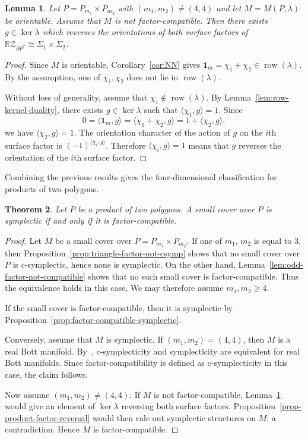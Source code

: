 \documentclass{amsart}
\newtheorem{theorem}{Theorem}[section]
\newtheorem{lemma}[theorem]{Lemma}
\numberwithin{equation}{section}
\theoremstyle{definition}
\theoremstyle{remark}
\newcommand{\RZ}{\mathbb R\mathcal Z}
\newcommand{\one}{\mathbf 1}
\DeclareMathOperator{\row}{row}
\begin{document}
\begin{lemma}\label{lem-failure-factor-compatible-reverses}
    Let $P=P_{m_1}\times P_{m_2}$ with $(m_1,m_2) \neq (4,4)$ and let $M=M(P,\lambda)$ be orientable.
    Assume that $M$ is not factor-compatible.
    Then there exists $g \in \ker\lambda$ which reverses the orientations of both surface factors of $\RZ_{\partial P^\ast}\cong\Sigma_1\times\Sigma_2$.
\end{lemma}
\begin{proof}
    Since $M$ is orientable, Corollary~\ref{cor:NN} gives $\one_{m}=\chi_1+\chi_2\in\row(\lambda)$.
    By the assumption, one of $\chi_1,\chi_2$ does not lie in $\row(\lambda)$.
    
    Without loss of generality, assume that $\chi_1\notin\row(\lambda)$.
    By Lemma~\ref{lem:row-kernel-duality}, there exists $g \in\ker\lambda$ such that $\langle \chi_1, g \rangle=1$.
    Since
    $$
        0 = \langle \one_{m},g \rangle = \langle \chi_1+\chi_2,g\rangle = 1+\langle \chi_2,g\rangle,
    $$
    we have $\langle \chi_2,g\rangle=1$.
    The orientation character of the action of $g$ on the $i$th surface factor is $(-1)^{\langle\chi_i,g\rangle}$.
    Therefore $\langle\chi_i,g\rangle=1$ means that $g$ reverses the orientation of the $i$th surface factor.
\end{proof}

Combining the previous results gives the four-dimensional classification for products of two polygons.

\begin{theorem}\label{thm-two-polygons-factor-compatible}
    Let $P$ be a product of two polygons.
    A small cover over $P$ is symplectic if and only if it is factor-compatible.
\end{theorem}
\begin{proof}
    Let $M$ be a small cover over $P=P_{m_1} \times P_{m_2}$.
    If one of $m_1$, $m_2$ is equal to $3$, then Proposition~\ref{prop:triangle-factor-not-csymp} shows that no small cover over $P$ is c-symplectic, hence none is symplectic. 
    On the other hand, Lemma~\ref{lem:odd-factor-not-compatible} shows that no such small cover is factor-compatible. 
    Thus the equivalence holds in this case. 
    We may therefore assume $m_1,m_2 \geq 4$.
    
    If the small cover is factor-compatible, then it is symplectic by Proposition~\ref{prop:factor-compatible-symplectic}.
    
    Conversely, assume that $M$ is symplectic.
    If $(m_1,m_2)=(4,4)$, then $M$ is a real Bott manifold.
    By~\cite{Ishida2011}, c-symplecticity and symplecticity are equivalent for real Bott manifolds.
    Since factor-compatibility is defined as c-symplecticity in this case, the claim follows.
    
    Now assume $(m_1,m_2)\ne(4,4)$.
    If $M$ is not factor-compatible, Lemma~\ref{lem-failure-factor-compatible-reverses} would give an element of $\ker\lambda$ reversing both surface factors.
    Proposition~\ref{prop-product-factor-reversal} would then rule out symplectic structures on $M$, a contradiction.
    Hence $M$ is factor-compatible.
\end{proof}
\end{document}
